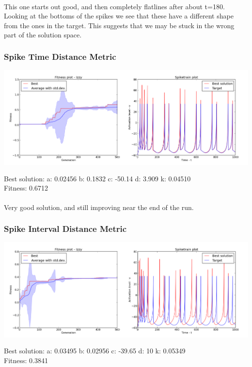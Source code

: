 \documentclass[a4paper,12pt]{article}
\begin{document}
\paragraph{}This one starts out good, and then completely flatlines after about t=180. Looking at the bottoms of the spikes we see that these have a different shape from the ones in the target. This suggests that we may be stuck in the wrong part of the solution space.

\subsubsection{Spike Time Distance Metric}
\centerline{\includegraphics[width=1.3\textwidth]{img/case2_time}}
Best solution: 
a: 0.02456 
b: 0.1832 
c: -50.14 
d: 3.909 
k: 0.04510 \\
Fitness: 0.6712
\paragraph{}Very good solution, and still improving near the end of the run.

\subsubsection{Spike Interval Distance Metric}
\centerline{\includegraphics[width=1.3\textwidth]{img/case2_int}}
Best solution: 
a: 0.03495 
b: 0.02956 
c: -39.65 
d: 10 
k: 0.05349 \\
Fitness: 0.3841
\end{document}
